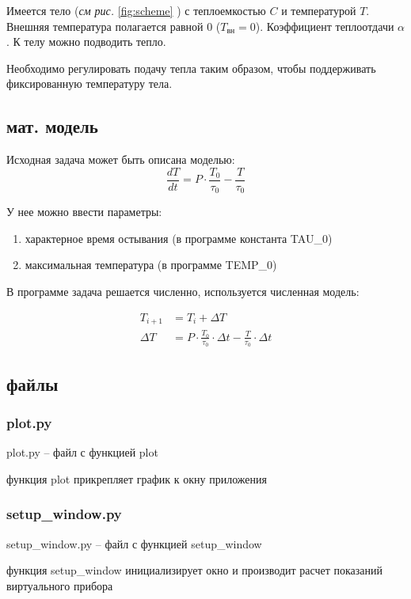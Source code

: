 \documentclass{article}
\begin{document}
Имеется тело (\textit{см рис.} \ref{fig:scheme} ) с теплоемкостью $C$ и температурой $T$. Внешняя температура полагается равной 0 ($T_{\text{вн}} = 0 $). Коэффициент теплоотдачи $\alpha$. К телу можно подводить тепло.

Необходимо регулировать подачу тепла таким образом, чтобы поддерживать фиксированную температуру тела.

\subsection{мат. модель}

Исходная задача может быть описана моделью:
\begin{equation}
    \frac{dT}{dt} = P \cdot \frac{T_0}{\tau_0} - \frac{T}{\tau_0}
\end{equation}

У нее можно ввести параметры:
\begin{enumerate}
    \item характерное время остывания (в программе константа TAU\_0)
    \item максимальная температура (в программе TEMP\_0) 
\end{enumerate}

В программе задача решается численно, используется численная модель:

\begin{align}
    T_{i+1} &= T_i + \Delta T \\
    \Delta T &= P \cdot \frac{T_0}{\tau_0} \cdot \Delta t - \frac{T}{\tau_0} \cdot \Delta t
\end{align}

\subsection{файлы}

\subsubsection{plot.py}
plot.py -- файл с функцией plot

функция plot прикрепляет график к окну приложения

\subsubsection{setup\_window.py}
setup\_window.py -- файл с функцией setup\_window

функция setup\_window инициализирует окно и производит расчет показаний виртуального прибора
\end{document}
